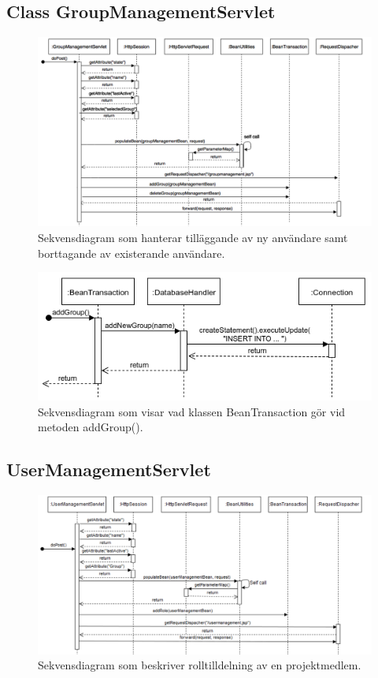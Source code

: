 \documentclass[paper=a4, fontsize=11pt,twoside]{article}
\begin{document}
\subsection{Class GroupManagementServlet}

\begin{figure}[H]
\centering
\includegraphics[width=175mm]{GroupManagementServlet}
\caption{Sekvensdiagram som hanterar tilläggande av ny användare samt borttagande av existerande användare.}
\end{figure}

\begin{figure}[H]
\centering
\includegraphics[width=160mm]{GroupManagementServlet2}
\caption{Sekvensdiagram som visar vad klassen BeanTransaction gör vid metoden addGroup().}
\end{figure}

\subsection{UserManagementServlet}

\begin{figure}[H]
\centering
\includegraphics[width=160mm]{UserManagementServlet}
\caption{Sekvensdiagram som beskriver rolltilldelning av en projektmedlem. }
\end{figure}
\end{document}
